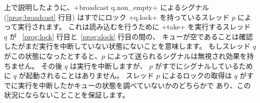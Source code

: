 上で説明したように、\ml+broadcast q.non_empty+ によるシグナル
(\ref{prog:broadcast} 行目) はすでにロック \ml+q.lock+ を持っているスレッド
$p$ によって実行されます。
これは読み込むを行うために \ml+take+ を実行するスレッド $q$ が
~\ref{prog:lock} 行目と~\ref{prog:slock} 行目の間の、
キューが空であることは確認したがまだ実行を中断していない状態にないことを意味します。
もしスレッド $q$ がこの状態になったとすると、$p$ によって送られるシグナルは無視され効果を持ちません。
その後 $q$ は実行を中断しますが、 $p$ がすでにシグナルしているために $q$ が起動されることはありません。
スレッド $p$ によるロックの取得は $q$ がすでに実行を中断したかキューの状態を調べていないかのどちらかで
あり、この状況にならないことことを保証します。

